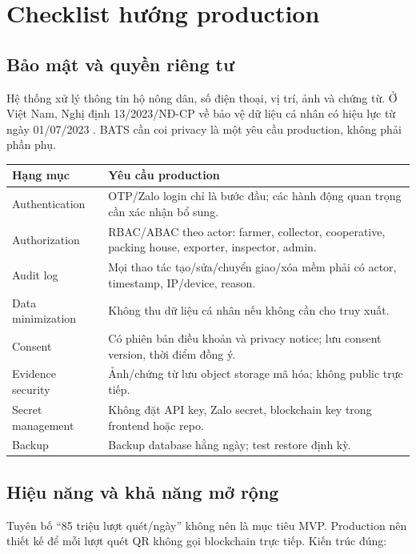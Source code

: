\documentclass[12pt,a4paper]{article}
\begin{document}
\section{Checklist hướng production}

\subsection{Bảo mật và quyền riêng tư}

Hệ thống xử lý thông tin hộ nông dân, số điện thoại, vị trí, ảnh và chứng từ. Ở Việt Nam, Nghị định 13/2023/NĐ-CP về bảo vệ dữ liệu cá nhân có hiệu lực từ ngày 01/07/2023 \cite{vn_decree_13}. BATS cần coi privacy là một yêu cầu production, không phải phần phụ.

\begin{longtable}{p{5cm}p{8.5cm}}
\toprule
\textbf{Hạng mục} & \textbf{Yêu cầu production} \\
\midrule
\endhead
Authentication & OTP/Zalo login chỉ là bước đầu; các hành động quan trọng cần xác nhận bổ sung. \\
\addlinespace
Authorization & RBAC/ABAC theo actor: farmer, collector, cooperative, packing house, exporter, inspector, admin. \\
\addlinespace
Audit log & Mọi thao tác tạo/sửa/chuyển giao/xóa mềm phải có actor, timestamp, IP/device, reason. \\
\addlinespace
Data minimization & Không thu dữ liệu cá nhân nếu không cần cho truy xuất. \\
\addlinespace
Consent & Có phiên bản điều khoản và privacy notice; lưu consent version, thời điểm đồng ý. \\
\addlinespace
Evidence security & Ảnh/chứng từ lưu object storage mã hóa; không public trực tiếp. \\
\addlinespace
Secret management & Không đặt API key, Zalo secret, blockchain key trong frontend hoặc repo. \\
\addlinespace
Backup & Backup database hằng ngày; test restore định kỳ. \\
\bottomrule
\end{longtable}

\subsection{Hiệu năng và khả năng mở rộng}

Tuyên bố ``85 triệu lượt quét/ngày'' không nên là mục tiêu MVP. Production nên thiết kế để mỗi lượt quét QR không gọi blockchain trực tiếp. Kiến trúc đúng:
\end{document}
